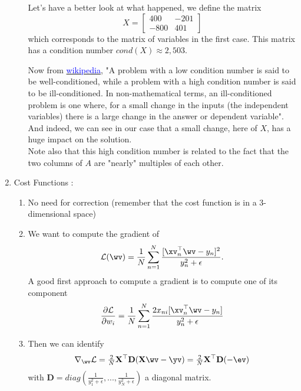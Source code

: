 \documentclass{./../../tex_import/ETHuebung_english}
\begin{document}
\begin{enumerate}
\begin{enumerate}
		Let's have a better look at what happened, we define the matrix
		\begin{equation}
		X=
		    \begin{bmatrix}
		            400 & -201 \\
		            -800 & 401
		    \end{bmatrix}
		\end{equation}
		which corresponds to the matrix of variables in the first case. This matrix has a condition number $cond(X) \approx 2,503$.
			
		Now from \href{https://en.wikipedia.org/wiki/Condition_number}{\textcolor{blue}{wikipedia}}, "A problem with a low condition number is said to be well-conditioned, while a problem with a high condition number is said to be ill-conditioned. In non-mathematical terms, an ill-conditioned problem is one where, for a small change in the inputs (the independent variables) there is a large change in the answer or dependent variable". And indeed, we can see in our case that a small change, here of $X$, has a huge impact on the solution. \\
		Note also that this high condition number is related to the fact that the two columns of $A$ are "nearly" multiples of each other.
	\end{enumerate}
	
	\item Cost Functions :
		\begin{enumerate}
			\item No need for correction (remember that the cost function is in a 3-dimensional space)
			\item We want to compute the gradient of
				\begin{equation*}
					\mathcal{L}(\wv) = \frac{1}{N} \sum_{n=1}^{N}{\frac{[\xv_n^\top\wv - y_n]^2}{y_n^2 +\epsilon}} .
				\end{equation*}
				A good first approach to compute a gradient is to compute one of its component
				\begin{equation*}
					\frac{\partial\mathcal{L}}{\partial w_i} = \frac{1}{N} \sum_{n=1}^{N}{\frac{2 x_{ni} [\xv_n^\top\wv - y_n]}{y_n^2 +\epsilon}}
				\end{equation*}

				
			\item Then we can identify
				\begin{equation}
					\nabla_{\wv}\mathcal{L} = \tfrac{2}{N}{\mathbf{X}^\top \mathbf{D} (\mathbf{X}\wv-\yv)} = \tfrac{2}{N}\mathbf{X}^\top \mathbf{D} (-\ev)
				\end{equation}
				with $\mathbf{D} = diag(\tfrac{1}{y_1^2 +\epsilon},...,\frac{1}{y_N^2 +\epsilon}) $ a diagonal matrix.
				

\end{enumerate}
\end{enumerate}
\end{document}
